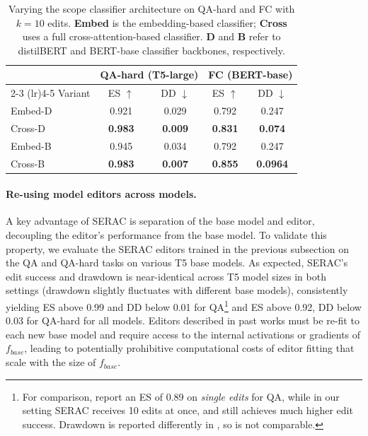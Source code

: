 \documentclass{article}
\newcommand{\basemodel}{f_{base}}
\newcommand{\name}{SERAC}
\begin{document}
\begin{table}
    \centering
    \small
    \begin{tabular}{lcccc}
        \toprule
        & \multicolumn{2}{c}{\textbf{QA-hard} (T5-large)} & \multicolumn{2}{c}{\textbf{FC} (BERT-base)} \\
        \cmidrule(lr){2-3} \cmidrule(lr){4-5}
        Variant & ES $\uparrow$ & DD $\downarrow$ & ES $\uparrow$ & DD $\downarrow$ \\
        \midrule
        Embed-D & 0.921 & 0.029 & 0.792 & 0.247 \\
        Cross-D & \textbf{0.983} & \textbf{0.009} & \textbf{0.831} & \textbf{0.074} \\
        Embed-B & 0.945 & 0.034 & 0.792 & 0.247 \\
        Cross-B & \textbf{0.983} & \textbf{0.007} & \textbf{0.855} & \textbf{0.0964} \\
        \bottomrule
    \end{tabular}
    \caption{Varying the scope classifier architecture on QA-hard and FC with $k=10$ edits. \textbf{Embed} is the embedding-based classifier; \textbf{Cross} uses a full cross-attention-based classifier. \textbf{D} and \textbf{B} refer to distilBERT and BERT-base classifier backbones, respectively.}
    \label{tab:cls_arch}
\end{table}


\paragraph{Re-using model editors across models.}
A key advantage of {\name} is separation of the base model and editor, decoupling the editor's performance from the base model. To validate this property, we evaluate the {\name} editors trained in the previous subsection on the QA and QA-hard tasks on various T5 base models. As expected, {\name}'s edit success and drawdown is near-identical across T5 model sizes in both settings (drawdown slightly fluctuates with different base models), consistently yielding ES above 0.99 and DD below 0.01 for QA\footnote{For comparison, \citet{mitchell2021fast} report an ES of 0.89 on \textit{single edits} for QA, while in our setting {\name} receives 10 edits at once, and still achieves much higher edit success. Drawdown is reported differently in \citet{mitchell2021fast}, so is not comparable.} and ES above 0.92, DD below 0.03 for QA-hard for all models. Editors described in past works must be re-fit to each new base model \citep{Sinitsin2020Editable,Cao2021EditingFK,mitchell2021fast,meng2022locating} and require access to the internal activations or gradients of $\basemodel$, leading to potentially prohibitive computational costs of editor fitting that scale with the size of $\basemodel$.
\end{document}
